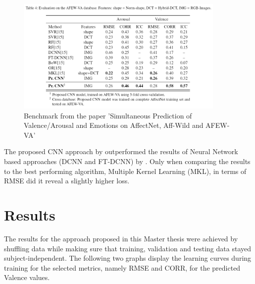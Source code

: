 \begin{figure}[H]
  \begin{center}
  \includegraphics[angle=0, width=0.9\textwidth]{Figures/benchmark.PNG}
  \caption{Benchmark from the paper 'Simultaneous Prediction of Valence/Arousal and Emotions on AffectNet, Aff-Wild and AFEW-VA' \citep{Handrich:2020:SimultaneousPredVA}}
  \label{fig:BenchmarkOnAFEW-VA}
  \end{center}
\end{figure}

The proposed CNN approach by \citet{Handrich:2020:SimultaneousPredVA} outperformed the results of Neural Network based approaches (DCNN and FT-DCNN) by \citet{Kossaifi:2017:AFEW-VADatabase}. Only when comparing the results to the best performing algorithm, Multiple Kernel Learning (MKL), in terms of RMSE did it reveal a slightly higher loss.



\section{Results}
The results for the approach proposed in this Master thesis were achieved by shuffling data while making sure that training, validation and testing data stayed subject-independent. The following two graphs display the learning curves during training for the selected metrics, namely RMSE and CORR, for the predicted Valence values.

